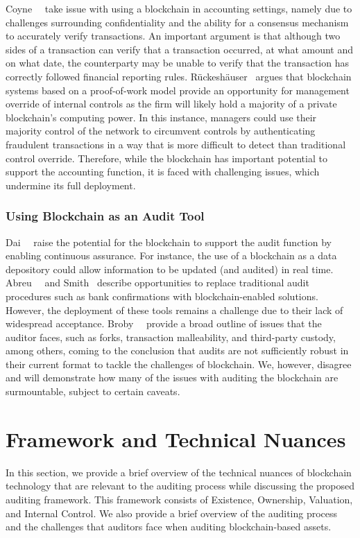 Coyne~\etal~\cite{coyne2017can} take issue with using a blockchain in accounting settings, namely due to challenges surrounding confidentiality and the ability for a consensus mechanism to accurately verify transactions. An important argument is that although two sides of a transaction can verify that a transaction occurred, at what amount and on what date, the counterparty may be unable to verify that the transaction has correctly followed financial reporting rules. Rückeshäuser~\cite{ruckeshauser2017we} argues that blockchain systems based on a proof-of-work model provide an opportunity for management override of internal controls as the firm will likely hold a majority of a private blockchain's computing power. In this instance, managers could use their majority control of the network to circumvent controls by authenticating fraudulent transactions in a way that is more difficult to detect than traditional control override. Therefore, while the blockchain has important potential to support the accounting function, it is faced with challenging issues, which undermine its full deployment.

\subsubsection{Using Blockchain as an Audit Tool}
Dai~\etal~\cite{dai2017toward} raise the potential for the blockchain to support the audit function by enabling continuous assurance. For instance, the use of a blockchain as a data depository could allow information to be updated (and audited) in real time. Abreu~\etal~\cite{abreu2018blockchain} and Smith~\cite{cgma2018blockchain} describe opportunities to replace traditional audit procedures such as bank confirmations with blockchain-enabled solutions. However, the deployment of these tools remains a challenge due to their lack of widespread acceptance. Broby~\etal~\cite{broby2017financial} provide a broad outline of issues that the auditor faces, such as forks, transaction malleability, and third-party custody, among others, coming to the conclusion that audits are not sufficiently robust in their current format to tackle the challenges of blockchain. We, however, disagree and will demonstrate how many of the issues with auditing the blockchain are surmountable, subject to certain caveats.

\section{Framework and Technical Nuances} \label{sec:auditing:framework} 
In this section, we provide a brief overview of the technical nuances of blockchain technology that are relevant to the auditing process while discussing the proposed auditing framework. This framework consists of Existence, Ownership, Valuation, and Internal Control. We also provide a brief overview of the auditing process and the challenges that auditors face when auditing blockchain-based assets.


